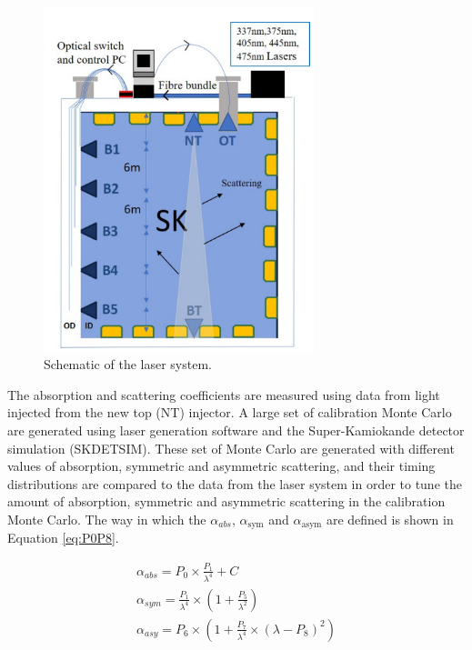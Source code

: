 \begin{figure}
    \centering
    \includegraphics[width=0.7\textwidth]{Figures/laser_system.png}
    \caption{Schematic of the laser system.}
    \label{fig:laser_system}
\end{figure}

The absorption and scattering coefficients are measured using data from light injected from the new top (NT) injector. A large set of calibration Monte Carlo are generated using laser generation software and the Super-Kamiokande detector simulation (SKDETSIM). These set of Monte Carlo are generated with different values of absorption, symmetric and asymmetric scattering, and their timing distributions are compared to the data from the laser system in order to tune the amount of absorption, symmetric and asymmetric scattering in the calibration Monte Carlo. The way in which the $\alpha_{abs}$, $\alpha_{\text {sym}}$ and $\alpha_{\text {asym}}$ are defined is shown in Equation \ref{eq:P0P8}.

\begin{equation}
\begin{gathered}
\alpha_{a b s}=P_{0} \times \frac{P_{1}}{\lambda^{4}}+C \label{eq:P0P8}\\ 
\alpha_{s y m}=\frac{P_{1}}{\lambda^{4}} \times\left(1+\frac{P_{5}}{\lambda^{2}}\right) \\
\alpha_{a s y}=P_{6} \times\left(1+\frac{P_{7}}{\lambda^{4}} \times\left(\lambda-P_{8}\right)^{2}\right)
\end{gathered}
\end{equation}

